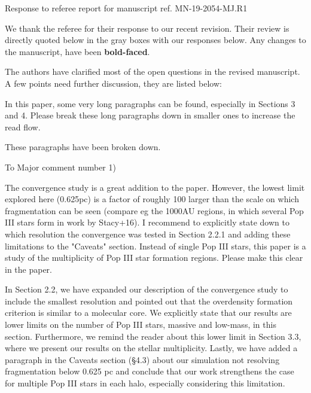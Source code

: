 \documentclass[11pt]{article}
\newenvironment{referee}[1][]{%
    \ignorespaces%
    \begin{mdframed}[style=myquotestyle,#1]%
}{%
    \end{mdframed}%
    \ignorespacesafterend%
}%
\begin{document}
\begin{center} 
\bfseries{
\begin{large}
  Response to referee report for manuscript ref. MN-19-2054-MJ.R1
\end{large}
}
\end{center}

We thank the referee for their response to our recent revision. Their review is directly quoted below in the gray boxes with our responses below.  Any changes to the manuscript, have been \textbf{bold-faced}.

\begin{referee}
    The authors have clarified most of the open questions in the revised manuscript. A few points need further discussion, they are listed below: 
\end{referee}

\begin{referee}
    In this paper, some very long paragraphs can be found, especially in Sections 3 and 4. Please break these long paragraphs down in smaller ones to increase the read flow. 
\end{referee}
    These paragraphs have been broken down. 

\begin{referee}
    To Major comment number 1) 

    The convergence study is a great addition to the paper. However, the lowest limit explored here (0.625pc) is a factor of roughly 100 larger than the scale on which fragmentation can be seen (compare eg the 1000AU regions, in which several Pop III stars form in work by Stacy+16). I recommend to explicitly state down to which resolution the convergence was tested in Section 2.2.1 and adding these limitations to the "Caveats" section. Instead of single Pop III stars, this paper is a study of the multiplicity of Pop III star formation regions. Please make this clear in the paper. 
\end{referee}
    In Section 2.2, we have expanded our description of the convergence study to include the smallest resolution and pointed out that the overdensity formation criterion is similar to a molecular core.  We explicitly state that our results are lower limits on the number of Pop III stars, massive and low-mass, in this section.  Furthermore, we remind the reader about this lower limit in Section 3.3, where we present our results on the stellar multiplicity.  Lastly, we have added a paragraph in the Caveats section (\S4.3) about our simulation not resolving fragmentation below 0.625 pc and conclude that our work strengthens the case for multiple Pop III stars in each halo, especially considering this limitation.
    
\end{document}
